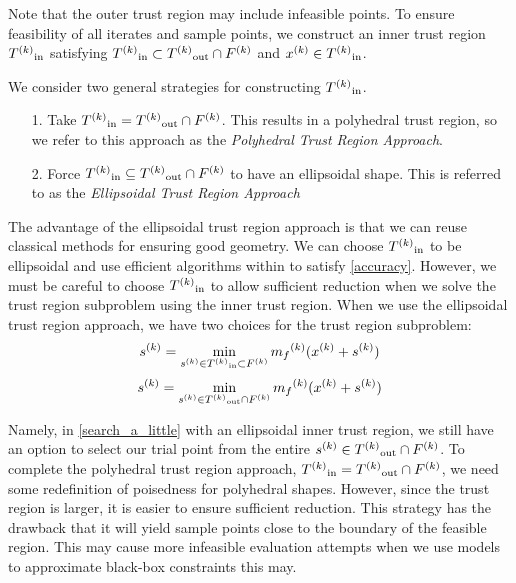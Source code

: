 Note that the outer trust region may include infeasible points.
To ensure feasibility of all iterates and sample points, we construct an inner trust region ${T^{(k)}}_{\text{in}}$  satisfying 
${T^{(k)}}_{\text{in}} \subset {T^{(k)}}_{\text{out}} \cap {F}^{(k)}$ and ${x}^{(k)} \in {T^{(k)}}_{\text{in}}$.


We consider two general strategies for constructing ${T^{(k)}}_{\text{in}}$.
\begin{itemize}
\item[1.] Take $\label{redpill} {T^{(k)}}_{\text{in}} = {T^{(k)}}_{\text{out}} \cap {F}^{(k)}$. This results in a polyhedral trust region, so we refer to this approach as the \emph{Polyhedral Trust Region Approach}.
\item[2.] Force $\label{bluepill} {T^{(k)}}_{\text{in}} \subseteq {T^{(k)}}_{\text{out}} \cap {F}^{(k)}$ to have an ellipsoidal shape. This is referred to as the \emph{Ellipsoidal Trust Region Approach}
\end{itemize}

The advantage of the ellipsoidal trust region approach is that we can reuse classical methods for ensuring good geometry.
We can choose ${T^{(k)}}_{\text{in}}$ to be ellipsoidal and use efficient algorithms within \cite{DUMMY:intro_book} to satisfy \cref{accuracy}.
However, we must be careful to choose ${T^{(k)}}_{\text{in}}$ to allow sufficient reduction when we solve the trust region subproblem using the inner trust region.
\label{which_trust_region}
When we use the ellipsoidal trust region approach, we have two choices for the trust region subproblem:
\begin{align}
{{s}^{(k)}} = \min_{{{s}^{(k)}} \in {T^{(k)}}_{\text{in}} \subset {F}^{(k)}} {{m}_f}^{(k)}({x}^{(k)} + {{s}^{(k)}}) \label{search_a_little}
\end{align}
\begin{align}
{{s}^{(k)}} = \min_{{{s}^{(k)}} \in {T^{(k)}}_{\text{out}} \cap {F}^{(k)}} {{m}_f}^{(k)}({x}^{(k)} + {{s}^{(k)}}) \label{search_a_lot}
\end{align}
 
Namely, in \cref{search_a_little} with an ellipsoidal inner trust region, we still have an option to select our trial point from the entire ${{s}^{(k)}} \in {T^{(k)}}_{\text{out}} \cap {F}^{(k)}$.
To complete the polyhedral trust region approach, ${T^{(k)}}_{\text{in}} = {T^{(k)}}_{\text{out}} \cap {F}^{(k)}$, we need some redefinition of poisedness for polyhedral shapes.
However, since the trust region is larger, it is easier to ensure sufficient reduction.
This strategy has the drawback that it will yield sample points close to the boundary of the feasible region.
This may cause more infeasible evaluation attempts when we use models to approximate black-box constraints this may.

